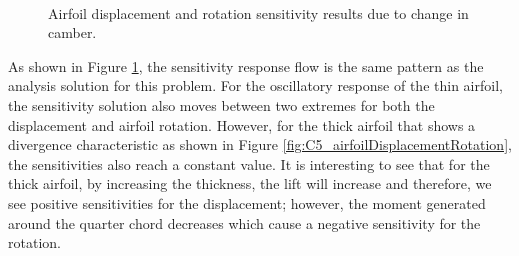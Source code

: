 \begin{figure}[H]
    \centering
    \quad
    \\
    \quad
    \caption{Airfoil displacement and rotation sensitivity results due to change in camber.}
    \label{fig:C5_airfoilSensitivityTimeHistory}
\end{figure}
%
As shown in Figure \ref{fig:C5_airfoilSensitivityTimeHistory}, the sensitivity response flow is the same pattern as the analysis solution for this problem. For the oscillatory response of the thin airfoil, the sensitivity solution also moves between two extremes for both the displacement and airfoil rotation. However, for the thick airfoil that shows a divergence characteristic as shown in Figure \ref{fig:C5_airfoilDisplacementRotation}, the sensitivities also reach a constant value. It is interesting to see that for the thick airfoil, by increasing the thickness, the lift will increase and therefore, we see positive sensitivities for the displacement; however, the moment generated around the quarter chord decreases which cause a negative sensitivity for the rotation.


